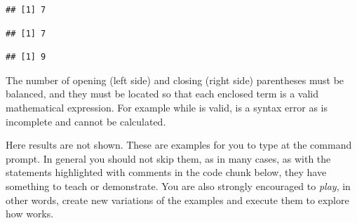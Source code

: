 \documentclass[krantz2]{krantz}\usepackage{knitr}%
\begin{document}
\begin{knitrout}\footnotesize
{}\color{fgcolor}\begin{kframe}
\begin{alltt}
 \hlopt{+}  \hlopt{*} 
\end{alltt}
\begin{verbatim}
## [1] 7
\end{verbatim}
\begin{alltt}
 \hlopt{+} \hlstd{(} \hlopt{*} \hlstd{)}
\end{alltt}
\begin{verbatim}
## [1] 7
\end{verbatim}
\begin{alltt}
\hlstd{(} \hlopt{+} \hlstd{)} \hlopt{*} 
\end{alltt}
\begin{verbatim}
## [1] 9
\end{verbatim}
\end{kframe}
\end{knitrout}

The number of opening (left side) and closing (right side) parentheses must be balanced, and they must be located so that each enclosed term is a valid mathematical expression. For example while  is valid,  is a syntax error as  is incomplete and cannot be calculated.

\begin{playground}
Here results are not shown. These are examples for you to type at the command prompt. In general you should not skip them, as in many cases, as with the statements highlighted with comments in the code chunk below, they have something to teach or demonstrate. You are also strongly encouraged to \emph{play}, in other words, create new variations of the examples and execute them to explore how \Rlang works.

\begin{knitrout}\footnotesize
{}\color{fgcolor}\begin{kframe}
\begin{alltt}
 \hlopt{+} 
 \hlopt{*} 
 \hlopt{+}  \hlopt{/} 
\hlstd{(} \hlopt{+} \hlstd{)} \hlopt{/} 
\hlopt{^} \hlopt{+} 
\hlstd{(}\hlstd{)}
 
  \hlstd{=} \hlstd{)}
 
\hlstd{(}\hlstd{)}
\hlstd{(}\hlstd{)}
\hlstd{(}\hlstd{)}
\hlstd{(}\hlstd{)}
\end{alltt}
\end{kframe}
\end{knitrout}

\end{playground}
\end{document}
